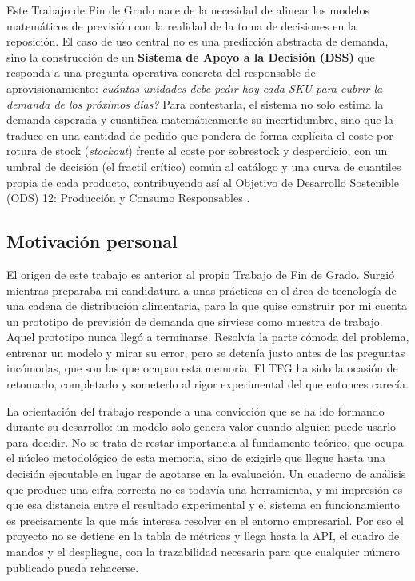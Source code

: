Este Trabajo de Fin de Grado nace de la necesidad de alinear los modelos matemáticos de previsión
con la realidad de la toma de decisiones en la reposición. El caso de uso central no es una
predicción abstracta de demanda, sino la construcción de un \textbf{Sistema de Apoyo a la Decisión
(DSS)} que responda a una pregunta operativa concreta del responsable de aprovisionamiento:
\emph{\textquestiondown cuántas unidades debe pedir hoy cada SKU para cubrir la demanda de los
próximos días?} Para contestarla, el sistema no solo estima la demanda esperada y cuantifica
matemáticamente su incertidumbre, sino que la traduce en una cantidad de pedido que pondera de forma
explícita el coste por rotura de stock (\textit{stockout}) frente al coste por sobrestock y
desperdicio, con un umbral de decisión (el fractil crítico) común al catálogo y una
curva de cuantiles propia de cada producto, contribuyendo así al Objetivo de Desarrollo Sostenible (ODS) 12: Producción y Consumo
Responsables \cite{ods12un}.

\subsection{Motivación personal}
El origen de este trabajo es anterior al propio Trabajo de Fin de Grado. Surgió mientras preparaba mi
candidatura a unas prácticas en el área de tecnología de una cadena de distribución alimentaria, para
la que quise construir por
mi cuenta un prototipo de previsión de demanda que sirviese como muestra de trabajo. Aquel prototipo
nunca llegó a terminarse. Resolvía la parte cómoda del problema, entrenar un modelo y mirar su
error, pero se detenía justo antes de las preguntas incómodas, que son las que ocupan esta memoria.
El TFG ha sido la ocasión de retomarlo, completarlo y someterlo al rigor experimental del que
entonces carecía.

La orientación del trabajo responde a una convicción que se ha ido formando durante su desarrollo: un
modelo solo genera valor cuando alguien puede usarlo para decidir. No se trata de restar importancia
al fundamento teórico, que ocupa el núcleo metodológico de esta memoria, sino de exigirle que llegue
hasta una decisión ejecutable en lugar de agotarse en la evaluación. Un cuaderno de análisis que
produce una cifra correcta no es todavía una herramienta, y mi impresión es que esa distancia
entre el resultado experimental y el sistema en funcionamiento es precisamente la que más
interesa resolver en el entorno empresarial. Por eso el proyecto no se detiene en la tabla de
métricas y llega hasta la API, el cuadro de mandos y el despliegue, con la trazabilidad necesaria
para que cualquier número publicado pueda rehacerse.

